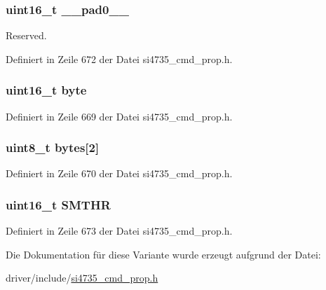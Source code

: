 \subsubsection[{\+\_\+\+\_\+pad0\+\_\+\+\_\+}]{\setlength{\rightskip}{0pt plus 5cm}uint16\+\_\+t \+\_\+\+\_\+pad0\+\_\+\+\_\+}\label{unionfm__soft__mute__snr__thres_a77132c2c26a75f5b8751b235cda23828}


Reserved. 



Definiert in Zeile 672 der Datei si4735\+\_\+cmd\+\_\+prop.\+h.

\hypertarget{unionfm__soft__mute__snr__thres_ab0549c1b5ea980a02e7eab77e21fea49}{}
\subsubsection[{byte}]{\setlength{\rightskip}{0pt plus 5cm}uint16\+\_\+t byte}\label{unionfm__soft__mute__snr__thres_ab0549c1b5ea980a02e7eab77e21fea49}


Definiert in Zeile 669 der Datei si4735\+\_\+cmd\+\_\+prop.\+h.

\hypertarget{unionfm__soft__mute__snr__thres_a46e4c05d20a047ec169f60d3167e912e}{}
\subsubsection[{bytes}]{\setlength{\rightskip}{0pt plus 5cm}uint8\+\_\+t bytes\mbox{[}2\mbox{]}}\label{unionfm__soft__mute__snr__thres_a46e4c05d20a047ec169f60d3167e912e}


Definiert in Zeile 670 der Datei si4735\+\_\+cmd\+\_\+prop.\+h.

\hypertarget{unionfm__soft__mute__snr__thres_a843deda9d37a8dde2d92e9b98cc5a817}{}
\subsubsection[{S\+M\+T\+H\+R}]{\setlength{\rightskip}{0pt plus 5cm}uint16\+\_\+t S\+M\+T\+H\+R}\label{unionfm__soft__mute__snr__thres_a843deda9d37a8dde2d92e9b98cc5a817}


Definiert in Zeile 673 der Datei si4735\+\_\+cmd\+\_\+prop.\+h.



Die Dokumentation für diese Variante wurde erzeugt aufgrund der Datei\+:\begin{DoxyCompactItemize}
\item 
driver/include/\hyperlink{si4735__cmd__prop_8h}{si4735\+\_\+cmd\+\_\+prop.\+h}\end{DoxyCompactItemize}
